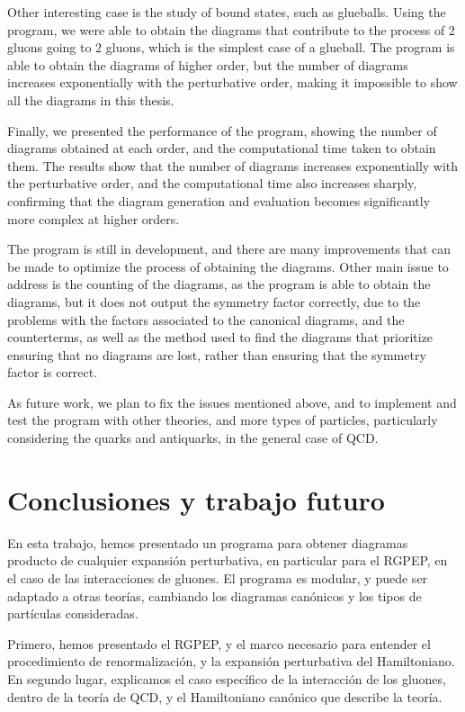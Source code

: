\documentclass[11pt,a4paper,twoside,pdf]{article}
\numberwithin{equation}{section}
\begin{document}
Other interesting case is the study of bound states, such as glueballs.
Using the program, we were able to obtain the diagrams that contribute to the process
of 2 gluons going to 2 gluons, which is the simplest case of a glueball.
The program is able to obtain the diagrams of higher order, but the number of
diagrams increases exponentially with the perturbative order, making it impossible
to show all the diagrams in this thesis.

Finally, we presented the performance of the program, showing the number of diagrams
obtained at each order, and the computational time taken to obtain them. The results
show that the number of diagrams increases exponentially with the perturbative order,
and the computational time also increases sharply, confirming that the diagram generation
and evaluation becomes significantly more complex at higher orders.

The program is still in development, and there are many improvements that can
be made to optimize the process of obtaining the diagrams. Other main issue to
address is the counting of the diagrams, as the program is able to obtain the diagrams,
but it does not output the symmetry factor correctly, due to the problems with the factors
associated to the canonical diagrams, and the counterterms, as well as the method
used to find the diagrams that prioritize ensuring that no diagrams are lost, rather than
ensuring that the symmetry factor is correct.

As future work, we plan to fix the issues mentioned above, and to implement and 
test the program with other theories, and more types of particles, particularly
considering the quarks and antiquarks, in the general case of QCD. 

\section{Conclusiones y trabajo futuro} \label{sec:conclusions_es}

En esta trabajo, hemos presentado un programa para obtener diagramas producto de cualquier
expansi\'on perturbativa, en particular para el RGPEP, en el caso de las interacciones de gluones.
El programa es modular, y puede ser adaptado a otras teor\'ias, cambiando los diagramas can\'onicos
y los tipos de part\'iculas consideradas.

Primero, hemos presentado el RGPEP, y el marco necesario para entender el
procedimiento de renormalizaci\'on, y la expansi\'on perturbativa del Hamiltoniano.
En segundo lugar, explicamos el caso espec\'ifico de la interacción de los gluones, dentro de la
teor\'ia de QCD, y el Hamiltoniano can\'onico que describe la teor\'ia.
\end{document}
